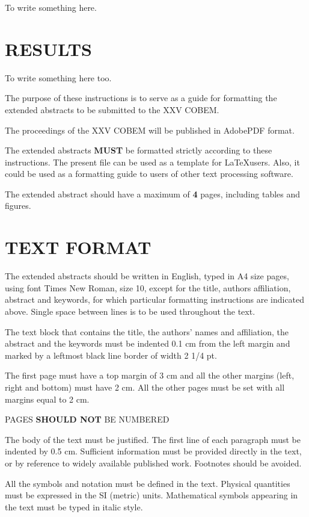 \documentclass[10pt,fleqn,a4paper,twoside]{article}
\begin{document}
To write something here.

\section{RESULTS}

To write something here too.

The purpose of these instructions is to serve as a guide for formatting the extended abstracts to be submitted to the XXV COBEM.

The proceedings of the XXV COBEM will be published in Adobe\texttrademark\space PDF format.

The extended abstracts {\bf MUST} be formatted strictly according to these instructions. The present file can be used as a template for \LaTeX\space users. Also, it could be used as a formatting guide to users of other text processing software.

The extended abstract should have a maximum of {\bf 4} pages, including tables and figures.

\section{TEXT FORMAT}

The extended abstracts should be written in English, typed in A4 size pages, using font Times New Roman, size 10, except for the title, authors affiliation, abstract and keywords, for which particular formatting instructions are indicated above. Single space between lines is to be used throughout the text.

The text block that contains the title, the authors' names and affiliation, the abstract and the keywords must be indented 0.1 cm from the left margin and marked by a leftmost black line border of width 2 1/4 pt.

The first page must have a top margin of 3 cm and all the other margins (left, right and bottom) must have 2 cm. All the other pages must be set with all margins equal to 2 cm.

PAGES {\bf SHOULD NOT} BE NUMBERED

The body of the text must be justified. The first line of each paragraph must be indented by 0.5 cm. Sufficient information must be provided directly in the text, or by reference to widely available published work. Footnotes should be avoided.

All the symbols and notation must be defined in the text. Physical quantities must be expressed in the SI (metric) units. Mathematical symbols appearing in the text must be typed in italic style.
\end{document}
